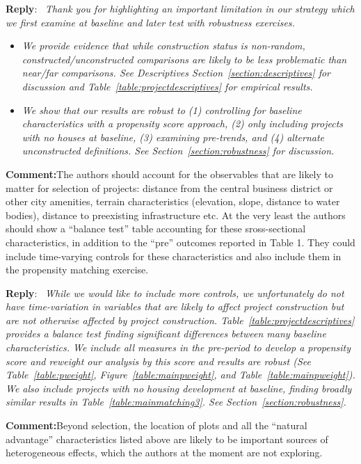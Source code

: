 \documentclass{article}
\newcommand{\reply}{\medskip \noindent \textbf{Reply}:\ \textit }
\newcommand{\sr}{\begin{minipage}{\dimexpr\textwidth-3cm}}
\newcommand{\er}{\end{minipage}}
\newcommand{\cc}{\medskip \noindent \textbf{Comment:}\hspace{2em}}
\begin{document}
\sr
\reply{ Thank you for highlighting an important limitation in our strategy which we first examine at baseline and later test with robustness exercises.}
\begin{itemize}
\item \textit{We provide evidence that while construction status is non-random, constructed/unconstructed comparisons are likely to be less problematic than near/far comparisons.  See Descriptives Section~\ref{section:descriptives} for discussion and Table~\ref{table:projectdescriptives} for empirical results. }
\item \textit{We show that our results are robust to (1) controlling for baseline characteristics with a propensity score approach, (2) only including projects with no houses at baseline, (3) examining pre-trends, and (4) alternate unconstructed definitions.  See Section~\ref{section:robustness} for discussion. }

\end{itemize} 
\er

\cc The authors should account for the observables that are likely to matter for selection of projects: distance from the central business district or other city amenities, terrain characteristics (elevation, slope, distance to water bodies), distance to preexisting infrastructure etc. At the very least the authors should show a “balance test” table accounting for these sross-sectional characteristics, in addition to the “pre” outcomes reported in Table 1. They could include time-varying controls for these characteristics and also include them in the propensity matching exercise.

\sr
\reply{ While we would like to include more controls, we unfortunately  do not have time-variation in variables that are likely to affect project construction but are not otherwise affected by project construction.  Table~\ref{table:projectdescriptives} provides a balance test finding significant differences between many baseline characteristics.  We include all measures in the pre-period to develop a propensity score and reweight our analysis by this score and results are robust (See Table~\ref{table:pweight}, Figure~\ref{table:mainpweight}, and Table~\ref{table:mainpweight}).  We also include projects with no housing development at baseline, finding broadly similar results in Table~\ref{table:mainmatching3}. See Section~\ref{section:robustness}.  }\\
\er

\cc Beyond selection, the location of plots and all the “natural advantage” characteristics listed above are likely to be important sources of heterogeneous effects, which the authors at the moment are not exploring.
\end{document}
